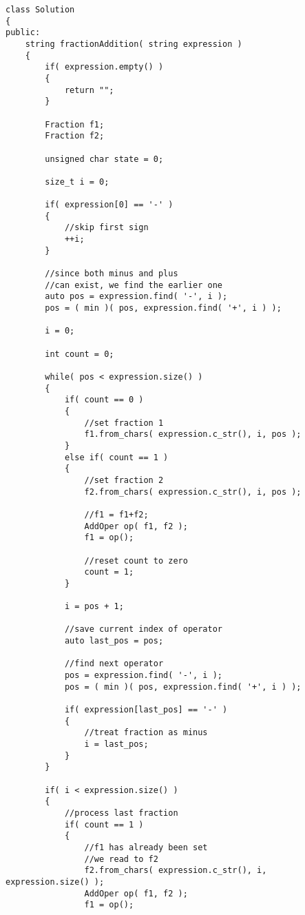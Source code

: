 \setcounter{lstlisting}{0}
\begin{lstlisting}[style=customc, caption={GCD}]
class Solution
{
public:
    string fractionAddition( string expression )
    {
        if( expression.empty() )
        {
            return "";
        }

        Fraction f1;
        Fraction f2;

        unsigned char state = 0;

        size_t i = 0;

        if( expression[0] == '-' )
        {
            //skip first sign
            ++i;
        }

        //since both minus and plus
        //can exist, we find the earlier one
        auto pos = expression.find( '-', i );
        pos = ( min )( pos, expression.find( '+', i ) );

        i = 0;

        int count = 0;

        while( pos < expression.size() )
        {
            if( count == 0 )
            {
                //set fraction 1
                f1.from_chars( expression.c_str(), i, pos );
            }
            else if( count == 1 )
            {
                //set fraction 2
                f2.from_chars( expression.c_str(), i, pos );

                //f1 = f1+f2;
                AddOper op( f1, f2 );
                f1 = op();

                //reset count to zero
                count = 1;
            }

            i = pos + 1;

            //save current index of operator
            auto last_pos = pos;

            //find next operator
            pos = expression.find( '-', i );
            pos = ( min )( pos, expression.find( '+', i ) );

            if( expression[last_pos] == '-' )
            {
                //treat fraction as minus
                i = last_pos;
            }
        }

        if( i < expression.size() )
        {
            //process last fraction
            if( count == 1 )
            {
                //f1 has already been set
                //we read to f2
                f2.from_chars( expression.c_str(), i, expression.size() );
                AddOper op( f1, f2 );
                f1 = op();


\end{lstlisting}
